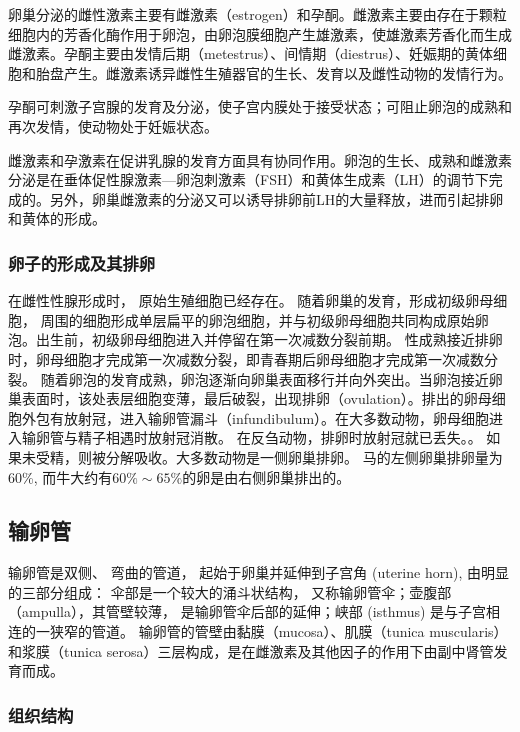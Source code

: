 卵巢分泌的雌性激素主要有雌激素（estrogen）和孕酮。雌激素主要由存在于颗粒细胞内的芳香化酶作用于卵泡，由卵泡膜细胞产生雄激素，使雄激素芳香化而生成雌激素。孕酮主要由发情后期（metestrus）、间情期（diestrus）、妊娠期的黄体细胞和胎盘产生。雌激素诱异雌性生殖器官的生长、发育以及雌性动物的发情行为。

孕酮可刺激子宫腺的发育及分泌，使子宫内膜处于接受状态；可阻止卵泡的成熟和再次发情，使动物处于妊娠状态。

雌激素和孕激素在促讲乳腺的发育方面具有协同作用。卵泡的生长、成熟和雌激素分泌是在垂体促性腺激素---卵泡刺激素（FSH）和黄体生成素（LH）的调节下完成的。另外，卵巢雌激素的分泌又可以诱导排卵前LH的大量释放，进而引起排卵和黄体的形成。

\subsubsection{卵子的形成及其排卵}

在雌性性腺形成时， 原始生殖细胞已经存在。 随着卵巢的发育，形成初级卵母细胞， 周围的细胞形成单层扁平的卵泡细胞，并与初级卵母细胞共同构成原始卵泡。出生前，初级卵母细胞进入并停留在第一次减数分裂前期。 性成熟接近排卵时，卵母细胞才完成第一次减数分裂，即青春期后卵母细胞才完成第一次减数分裂。 随着卵泡的发育成熟，卵泡逐渐向卵巢表面移行并向外突出。当卵泡接近卵巢表面时，该处表层细胞变薄，最后破裂，出现排卵（ovulation）。排出的卵母细胞外包有放射冠，进入输卵管漏斗（infundibulum）。在大多数动物，卵母细胞进入输卵管与精子相遇时放射冠消散。 在反刍动物，排卵时放射冠就已丢失。。 如果未受精，则被分解吸收。大多数动物是一侧卵巢排卵。 马的左侧卵巢排卵量为60\%, 而牛大约有$ 60\%\sim 65\% $的卵是由右侧卵巢排出的。


\subsection{输卵管}

输卵管是双侧、 弯曲的管道， 起始于卵巢并延伸到子宫角 (uterine horn), 由明显 的三部分组成： 伞部是一个较大的涌斗状结构， 又称输卵管伞；壶腹部（ampulla），其管壁较薄， 是输卵管伞后部的延伸；峡部 (isthmus) 是与子宫相连的一狭窄的管道。 输卵管的管壁由黏膜（mucosa）、肌膜（tunica muscularis）和浆膜（tunica serosa）三层构成，是在雌激素及其他因子的作用下由副中肾管发育而成。


\subsubsection{组织结构}


